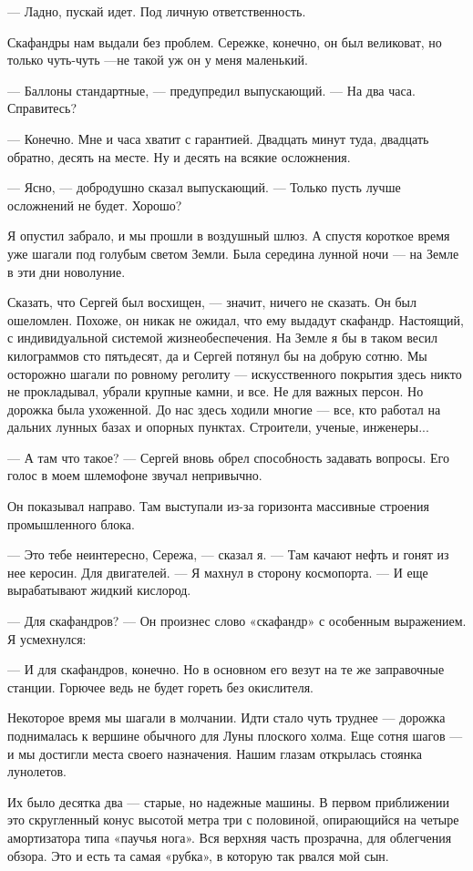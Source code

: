 \documentclass[11pt,a4paper,oneside]{article}
\begin{document}
— Ладно, пускай идет. Под личную ответственность.

Скафандры нам выдали без проблем. Сережке, конечно, он был великоват, но только чуть-чуть —не такой уж он у меня маленький.

— Баллоны стандартные, — предупредил выпускающий. — На два часа. Справитесь?

— Конечно. Мне и часа хватит с гарантией. Двадцать минут туда, двадцать обратно, десять на месте. Ну и десять на всякие осложнения.

— Ясно, — добродушно сказал выпускающий. — Только пусть лучше осложнений не будет. Хорошо?

Я опустил забрало, и мы прошли в воздушный шлюз. А спустя короткое время уже шагали под голубым светом Земли. Была середина лунной ночи — на Земле в эти дни новолуние.

Сказать, что Сергей был восхищен, — значит, ничего не сказать. Он был ошеломлен. Похоже, он никак не ожидал, что ему выдадут скафандр. Настоящий, с индивидуальной системой жизнеобеспечения. На Земле я бы в таком весил килограммов сто пятьдесят, да и Сергей потянул бы на добрую сотню. Мы осторожно шагали по ровному реголиту — искусственного покрытия здесь никто не прокладывал, убрали крупные камни, и все. Не для важных персон. Но дорожка была ухоженной. До нас здесь ходили многие — все, кто работал на дальних лунных базах и опорных пунктах. Строители, ученые, инженеры...

— А там что такое? — Сергей вновь обрел способность задавать вопросы. Его голос в моем шлемофоне звучал непривычно.

Он показывал направо. Там выступали из-за горизонта массивные строения промышленного блока.

— Это тебе неинтересно, Сережа, — сказал я. — Там качают нефть и гонят из нее керосин. Для двигателей. — Я махнул в сторону космопорта. — И еще вырабатывают жидкий кислород.

— Для скафандров? — Он произнес слово «скафандр» с особенным выражением. Я усмехнулся:

— И для скафандров, конечно. Но в основном его везут на те же заправочные станции. Горючее ведь не будет гореть без окислителя.

Некоторое время мы шагали в молчании. Идти стало чуть труднее — дорожка поднималась к вершине обычного для Луны плоского холма. Еще сотня шагов — и мы достигли места своего назначения. Нашим глазам открылась стоянка лунолетов.

Их было десятка два — старые, но надежные машины. В первом приближении это скругленный конус высотой метра три с половиной, опирающийся на четыре амортизатора типа «паучья нога». Вся верхняя часть прозрачна, для облегчения обзора. Это и есть та самая «рубка», в которую так рвался мой сын.
\end{document}

